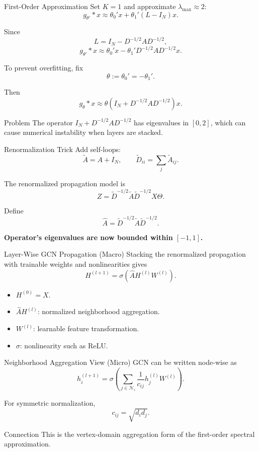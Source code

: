 \documentclass[aspectratio=1610,xcolor=dvipsnames,t]{beamer}
\newcommand{\keyterm}[1]{\textcolor{unirot}{\textbf{#1}}}
\begin{document}
\begin{frame}{First-Order Approximation}
Set $K=1$ and approximate $\lambda_{\max}\approx 2$:
\[
g_{\theta'}*x
\approx
\theta_0'x+\theta_1'(L-I_N)x.
\]

Since
\[
L=I_N-D^{-1/2}AD^{-1/2},
\]
\[
g_{\theta'}*x
\approx
\theta_0'x-\theta_1'D^{-1/2}AD^{-1/2}x.
\tag{GCN Eq. 6}
\]

To prevent overfitting, fix
\[
\theta:=\theta_0'=-\theta_1'.
\]

Then
\[
g_\theta*x
\approx
\theta\left(I_N+D^{-1/2}AD^{-1/2}\right)x.
\tag{GCN Eq. 7}
\]

\begin{alertblock}{Problem}
The operator $I_N+D^{-1/2}AD^{-1/2}$ has eigenvalues in $[0,2]$, which can cause numerical instability when layers are stacked.
\end{alertblock}
\end{frame}

\begin{frame}{Renormalization Trick}
Add self-loops:
\[
\widetilde A=A+I_N,
\qquad
\widetilde D_{ii}=\sum_j \widetilde A_{ij}.
\]

The renormalized propagation model is
\[
Z=\widetilde D^{-1/2}\widetilde A\widetilde D^{-1/2}X\Theta.
\tag{GCN Eq. 8}
\]

Define
\[
\widehat A=\widetilde D^{-1/2}\widetilde A\widetilde D^{-1/2}.
\]

\begin{center}
\keyterm{Operator's eigenvalues are now bounded within $[-1,1]$.}
\end{center}
\end{frame}

\begin{frame}{Layer-Wise GCN Propagation (Macro)}
Stacking the renormalized propagation with trainable weights and nonlinearities gives
\[
H^{(l+1)}
=
\sigma\left(\widehat A H^{(l)}W^{(l)}\right).
\tag{GCN Eq. 2}
\]

\begin{itemize}
  \item $H^{(0)}=X$.
  \item $\widehat A H^{(l)}$: normalized neighborhood aggregation.
  \item $W^{(l)}$: learnable feature transformation.
  \item $\sigma$: nonlinearity such as ReLU.
\end{itemize}
\end{frame}

\begin{frame}{Neighborhood Aggregation View (Micro)}
GCN can be written node-wise as
\[
h_i^{(l+1)}
=
\sigma\left(
\sum_{j\in\mathcal{N}_i}
\frac{1}{c_{ij}}h_j^{(l)}W^{(l)}
\right).
\tag{GCN Eq. 12}
\]

For symmetric normalization,
\[
c_{ij}=\sqrt{d_i d_j}.
\]

\begin{block}{Connection}
This is the vertex-domain aggregation form of the first-order spectral approximation.
\end{block}
\end{frame}
\end{document}
